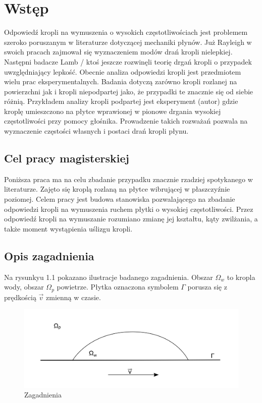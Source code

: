 \newpage %
\section{Wstęp}

Odpowiedź kropli na wymuszenia o wysokich częstotliwościach jest problemem szeroko poruszanym w literaturze dotyczącej mechaniki płynów. Już Rayleigh w swoich pracach zajmował się wyznaczeniem modów drań kropli nielepkiej. Następni badacze Lamb / ktoś jeszcze rozwinęli teorię drgań kropli o przypadek uwzględniający lepkość. Obecnie analiza odpowiedzi kropli jest przedmiotem wielu prac eksperymentalnych. Badania dotyczą zarówno kropli rozlanej na powierzchni jak i kropli niepodpartej jako, że przypadki te znacznie się od siebie różnią. Przykładem analizy kropli podpartej jest eksperyment (autor) gdzie kroplę umieszczono na płytce wprawionej w pionowe drgania wysokiej częstotliwości przy pomocy głośnika. Prowadzenie takich rozważań pozwala na wyznaczenie częstości własnych i postaci drań kropli płynu. 



\subsection{Cel pracy magisterskiej}

Poniższa praca ma na celu zbadanie przypadku znacznie rzadziej spotykanego w literaturze. Zajęto się kroplą rozlaną na płytce wibrującej w płaszczyźnie poziomej. Celem pracy jest budowa stanowiska pozwalającego na zbadanie odpowiedzi kropli na wymuszenia ruchem płytki o wysokiej częstotliwości. Przez odpowiedź kropli na wymuszanie rozumiano zmianę jej kształtu, kąty zwilżania, a także moment wystąpienia uślizgu kropli.


\subsection{Opis zagadnienia}

Na rysunkyu 1.1 pokazano ilustracje badanego zagadnienia. Obszar $\Omega_w$ to kropla wody, obszar $\Omega_p$ powietrze. Płytka oznaczona symbolem $\Gamma$ porusza się z prędkością $\overrightarrow{v}$ zmienną w czasie. 
\begin{figure}[!h]
    \label{fig:poślizg}
    \centering \includegraphics[width=\linewidth]{img/mv.png}
    \caption{Zagadnienia}
\end{figure}

